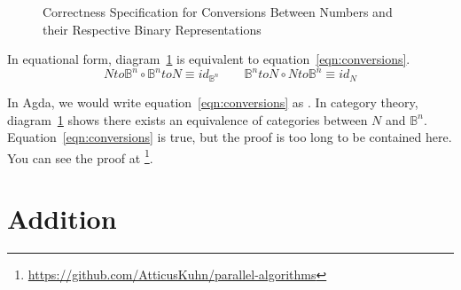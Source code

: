 \documentclass[14pt]{extarticle}  %
\begin{document}
\begin{figure}[h]
\centering
\caption{Correctness Specification for Conversions Between Numbers and their Respective Binary Representations}
\label{fig:conversions}
\end{figure}

In equational form, diagram~\ref{fig:conversions} is equivalent to equation~\ref{eqn:conversions}.
\begin{equation}\label{eqn:conversions}
  Nto\mathbb{B}^{n} \circ \mathbb{B}^{n}toN \equiv id_{\mathbb{B}^{n}} \qquad \mathbb{B}^{n}toN \circ Nto\mathbb{B}^{n} \equiv id_{N}
\end{equation}

In Agda, we would write equation~\ref{eqn:conversions} as .
In category theory, diagram~\ref{fig:conversions} shows there exists an equivalence of categories between $N$ and $\mathbb{B}^{n}$.
Equation~\ref{eqn:conversions} is true, but the proof is too long to be contained here. You can see the proof at \footnote{\url{https://github.com/AtticusKuhn/parallel-algorithms}}.
\section{Addition}
\end{document}

